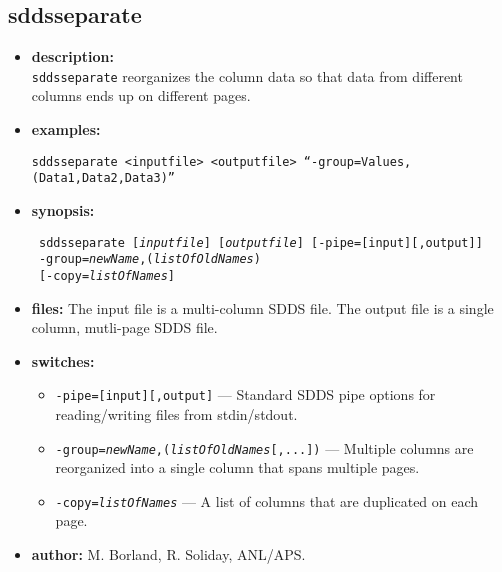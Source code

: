 \newpage 
\subsection{sddsseparate} 
\label{sddsseparate} 
 
\begin{itemize} 
\item {\bf description:} \hspace*{1mm}\\ 
{\tt sddsseparate} reorganizes the column data so that data from different columns ends up on different pages.
\item {\bf examples:} 
\begin{flushleft}
{\tt sddsseparate <inputfile> <outputfile> ``-group=Values,(Data1,Data2,Data3)'' }
\end{flushleft} 
\item {\bf synopsis:}  
\begin{flushleft}
{\tt 
sddsseparate [{\em inputfile}] [{\em outputfile}] [-pipe=[input][,output]] \\ \
-group={\em newName},({\em listOfOldNames}) \\ \
[-copy={\em listOfNames}]}
\end{flushleft} 
\item {\bf files:} 
The input file is a multi-column SDDS file. The output file is a single column, mutli-page SDDS file. 
\item {\bf switches:} 
    \begin{itemize} 
    \item {\tt -pipe=[input][,output]} --- Standard SDDS pipe options for reading/writing files from stdin/stdout.
    \item {\tt -group={\em newName},({\em listOfOldNames}[,...])} --- Multiple columns are reorganized into a single column that spans multiple pages.
    \item {\tt -copy={\em listOfNames}} --- A list of columns that are duplicated on each page.
\end{itemize} 

\item {\bf author:} M. Borland, R. Soliday, ANL/APS. 
\end{itemize} 
 
